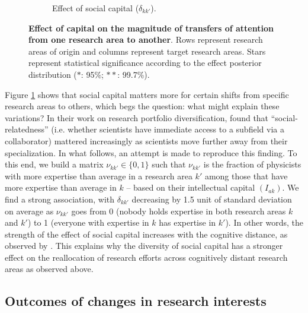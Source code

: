 \documentclass{article}
\begin{document}
\begin{figure}[h]
\begin{subfigure}{.5\textwidth}
    \caption{Effect of social capital ($\delta_{kk'}$).}
    \label{fig:social-capital-effect}
\end{subfigure}
\caption{\textbf{Effect of capital on the magnitude of transfers of attention from one research area to another}. Rows represent research areas of origin and columns represent target research areas. Stars represent statistical significance according to the effect posterior distribution ($\ast$: 95\%; $\ast\ast$: 99.7\%).}
\label{fig:test}
\end{figure}

Figure \ref{fig:social-capital-effect} shows that social capital matters more for certain shifts from specific research areas to others, which begs the question: what might explain these variations? In their work on research portfolio diversification, \citet{Tripodi2020} found that ``social-relatedness'' (i.e. whether scientists have immediate access to a subfield via a collaborator) mattered increasingly as scientists move further away from their specialization. In what follows, an attempt is made to reproduce this finding. To this end, we build a matrix $\nu_{kk'}\in\{0,1\}$ such that $\nu_{kk'}$ is the fraction of physicists with more expertise than average in a research area $k'$ among those that have more expertise than average in $k$ -- based on their intellectual capital $(I_{ak})$. We find a strong association, with $\delta_{kk'}$ decreasing by 1.5 unit of standard deviation on average as $\nu_{kk'}$ goes from 0 (nobody holds expertise in both research areas $k$ and $k'$) to 1 (everyone with expertise in $k$ has expertise in $k'$). In other words, the strength of the effect of social capital increases with the cognitive distance, as observed by \citet{Tripodi2020}. This explains why the diversity of social capital has a stronger effect on the reallocation of research efforts across cognitively distant research areas as observed above.

\subsection{\label{sec:outcomes}Outcomes of changes in research interests}
\end{document}
